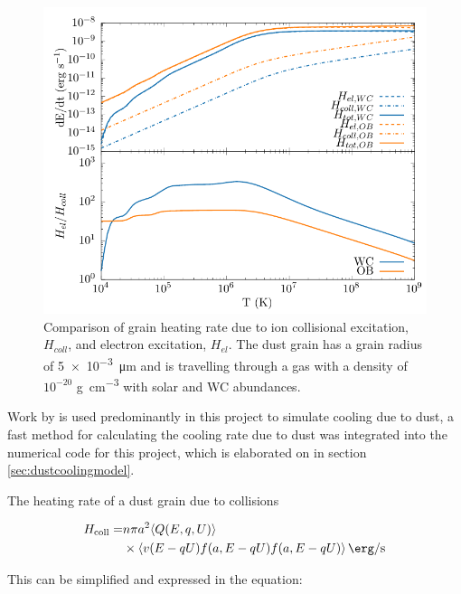\begin{figure}[h]
  \centering
  \includegraphics{assets/dust-electron-contribution/coll-el-comp.pdf}
  \caption[$H_{el}$ and $H_{coll}$ comparison]{Comparison of grain heating rate due to ion collisional excitation, $H_{coll}$, and electron excitation, $H_{el}$. The dust grain has a grain radius of \SI{5e-3}{\micro\metre} and is travelling through a gas with a density of $10^{-20}$ \si{\gram\per\centi\metre\cubed} with solar and WC abundances.}
  \label{fig:collisionalheatingcomparison}
\end{figure}


Work by \cite{dwek_infrared_1981} is used predominantly in this project to simulate cooling due to dust, a fast method for calculating the cooling rate due to dust was integrated into the numerical code for this project, which is elaborated on in section \ref{sec:dustcoolingmodel}.


The heating rate of a dust grain due to collisions 

\begin{equation}
  \begin{split} 
      H_\text{coll} = & n \pi a^2 \langle Q(E,q,U) \rangle \\
      & \times \langle v (E-qU) f(a,E-qU) f(a,E-qU) \rangle \, \si{\erg\per\second}
  \end{split}
\end{equation}

This can be simplified and expressed in the equation:

